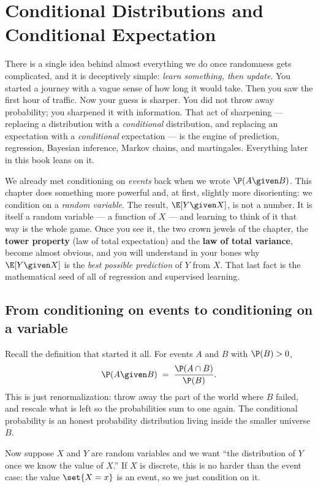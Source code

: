 \chapter{Conditional Distributions and Conditional Expectation}

There is a single idea behind almost everything we do once randomness gets complicated, and it is
deceptively simple: \emph{learn something, then update}. You started a journey with a vague sense of
how long it would take. Then you saw the first hour of traffic. Now your guess is sharper. You did not
throw away probability; you sharpened it with information. That act of sharpening --- replacing a
distribution with a \emph{conditional} distribution, and replacing an expectation with a
\emph{conditional} expectation --- is the engine of prediction, regression, Bayesian inference,
Markov chains, and martingales. Everything later in this book leans on it.

We already met conditioning on \emph{events} back when we wrote $\P(A \given B)$. This chapter does
something more powerful and, at first, slightly more disorienting: we condition on a \emph{random
variable}. The result, $\E[Y \given X]$, is not a number. It is itself a random variable --- a
function of $X$ --- and learning to think of it that way is the whole game. Once you see it, the two
crown jewels of the chapter, the \textbf{tower property} (law of total expectation) and the
\textbf{law of total variance}, become almost obvious, and you will understand in your bones why
$\E[Y \given X]$ is the \emph{best possible prediction} of $Y$ from $X$. That last fact is the
mathematical seed of all of regression and supervised learning.

\section{From conditioning on events to conditioning on a variable}
\label{ch15:from-events}

Recall the definition that started it all. For events $A$ and $B$ with $\P(B) > 0$,
\[
  \P(A \given B) \;=\; \frac{\P(A \cap B)}{\P(B)}.
\]
This is just renormalization: throw away the part of the world where $B$ failed, and rescale what is
left so the probabilities sum to one again. The conditional probability is an honest probability
distribution living inside the smaller universe $B$.

Now suppose $X$ and $Y$ are random variables and we want ``the distribution of $Y$ once we know the
value of $X$.'' If $X$ is discrete, this is no harder than the event case: the value $\set{X = x}$ is
an event, so we just condition on it.

